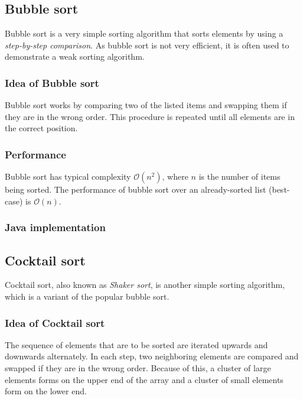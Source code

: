 \documentclass[]{pfBook}
\newcommand{\OO}{\mathcal{O}}
\begin{document}
	\subsection{Bubble sort}
	
	Bubble sort is a very simple sorting algorithm that sorts elements by using a \emph{step-by-step comparison}. As bubble sort is not very efficient, it is often used to demonstrate a weak sorting algorithm.
	
	\subsubsection{Idea of Bubble sort}
	
	Bubble sort works by comparing two of the listed items and swapping them if they are in the wrong order. This procedure is repeated until all elements are in the correct position.
	
	\subsubsection{Performance}
	
	Bubble sort has typical complexity $\OO(n^2)$, where $n$ is the number of items being sorted. The performance of bubble sort over an already-sorted list (best-case) is $\OO(n)$.
	
	\subsubsection{Java implementation}
	
	
	
	\subsection{Cocktail sort}
	
	Cocktail sort, also known as \emph{Shaker sort}, is another simple sorting algorithm, which is a variant of the popular bubble sort.
	
	\subsubsection{Idea of Cocktail sort}
	
	The sequence of elements that are to be sorted are iterated upwards and downwards alternately. In each step, two neighboring elements are compared and swapped if they are in the wrong order. Because of this, a cluster of large elements forms on the upper end of the array and a cluster of small elements form on the lower end.
	
\end{document}
